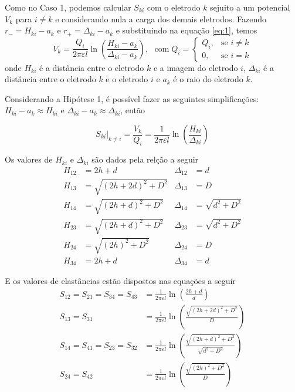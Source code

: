 \documentclass{aleph-revista}
\begin{document}
Como no Caso 1, podemos calcular $S_{ki}$ com o eletrodo $k$ sejuito a um potencial $V_k$ para $i \neq k$ e considerando nula a carga dos demais eletrodos. Fazendo $r_- = H_{ki} - a_{k}$ e $r_+ = \Delta_{ki} - a_{k}$ e substituindo na equação \eqref{eq:1}, temos
\begin{equation}\label{eq:7}
  V_k = \frac{Q_i}{2\pi\varepsilon l}\ln\left(\frac{H_{ki} - a_{k}}{\Delta_{ki} - a_{k}}\right) \text{,} \;\;\; \text{com} \; Q_i =
  \begin{cases}
    Q_i, & \text{se } i \neq k \\
    0,   & \text{se } i = k
  \end{cases}
\end{equation}
onde $H_{ki}$ é a distância entre o eletrodo $k$ e a imagem do eletrodo $i$, $\Delta_{ki}$ é a distância entre o eletrodo $k$ e o eletrodo $i$ e $a_{k}$ é o raio do eletrodo $k$.

Considerando a Hipótese 1, é possível fazer as seguintes simplificações: $H_{ki} - a_k \approx H_{ki}$ e $\Delta_{ki} - a_k \approx \Delta_{ki}$, então

\begin{equation}\label{eq:8}
  \left. S_{ki} \right|_{k \neq i} = \frac{V_k}{Q_i} = \frac{1}{2\pi\varepsilon l}\ln\left(\frac{H_{ki}}{\Delta_{ki}}\right)
\end{equation}

Os valores de $H_{ki}$ e $\Delta_{ki}$ são dados pela relção a seguir
\begin{align*}
  H_{12} & = 2h + d                   & \Delta_{12} & = d                \\
  H_{13} & = \sqrt{(2h + 2d)^2 + D^2} & \Delta_{13} & = D                \\
  H_{14} & =  \sqrt{(2h + d)^2 + D^2} & \Delta_{14} & = \sqrt{d^2 + D^2} \\
  H_{23} & =  \sqrt{(2h + d)^2 + D^2} & \Delta_{23} & = \sqrt{d^2 + D^2} \\
  H_{24} & =  \sqrt{(2h)^2 + D^2}     & \Delta_{24} & = D                \\
  H_{34} & = 2h + d                   & \Delta_{34} & = d
\end{align*}

E os valores de elastâncias estão dispostos nas equações a seguir
\begin{align}
  S_{12} = S_{21} = S_{34} = S_{43} & = \frac{1}{2\pi\varepsilon l}\ln\left(\frac{2h+d}{d}\right) \label{eq:9}                                    \\
  S_{13} = S_{31}                   & = \frac{1}{2\pi\varepsilon l}\ln\left(\frac{\sqrt{(2h + 2d)^2 + D^2}}{D}\right) \label{eq:10}               \\
  S_{14} = S_{41} = S_{23} = S_{32} & = \frac{1}{2\pi\varepsilon l}\ln\left(\frac{\sqrt{(2h + d)^2 + D^2}}{\sqrt{d^2 + D^2}}\right) \label{eq:11} \\
  S_{24} = S_{42}                   & = \frac{1}{2\pi\varepsilon l}\ln\left(\frac{\sqrt{(2h)^2 + D^2}}{D}\right) \label{eq:12}
\end{align}
\end{document}
